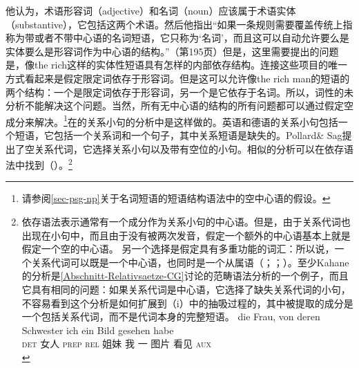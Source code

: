 他认为，术语形容词（adjective）和名词（noun）应该属于术语实体（substantive），它包括这两个术语。然后他指出“如果一条规则需要覆盖传统上指称为带或者不带中心语的名词短语，它只称为‘名词’，而且这可以自动允许要么是实体要么是形容词作为中心语的结构。”（第195页）但是，这里需要提出的问题是，像the rich这样的实体性短语具有怎样的内部依存结构。连接这些项目的唯一方式看起来是假定限定词依存于形容词。但是这可以允许像the rich man的短语的两个结构：一个是限定词依存于形容词，另一个是它依存于名词。所以，词性的未分析不能解决这个问题。当然，所有无中心语的结构的所有问题都可以通过假定空成分来解决。\footnote{请参阅\ref{sec-psg-np}关于名词短语的短语结构语法中的空中心语的假设。}在\hpsgc 的关系小句的分析中是这样做的\citep[\S~5]{ps2}。英语和德语的关系小句包括一个短语，它包括一个关系词和一个句子，其中关系短语是缺失的。Pollard\& Sag提出了空关系代词，它选择关系小句以及带有空位的小句\citep[--217]{ps2}。相似的分析可以在依存语法中找到（\citealp[]{Eroms2000a}）。\footnote{%
依存语法表示通常有一个成分作为关系小句的中心语。但是，由于关系代词也出现在小句中，而且由于没有被两次发音，假定一个额外的中心语基本上就是假定一个空的中心语。
%
另一个选择是假定具有多重功能的词汇：所以说，一个关系代词可以既是一个中心语，也同时是一个从属语（\citealp[\S 246, §8--11]{Tesniere2015a-not-crossreferenced}；\citealp[\page xlvi]{OK2015a}；\citealp[--130]{Kahane2009a}）。至少Kahane的分析是\ref{Abschnitt-Relativsaetze-CG}讨论的范畴语法分析的一个例子，而且它具有相同的问题：如果关系代词是中心语，它选择了缺失关系代词的小句，不容易看到这个分析是如何扩展到（i）中的抽吸过程的，其中被提取的成分是一个包括关系代词，而不是代词本身的完整短语。
\ea
\gll die Frau, von deren Schwester ich ein Bild gesehen habe\\
     \textsc{det} 女人 \textsc{prep} \textsc{rel} 姐妹 我 一 图片 看见 \textsc{aux}\\
\zlast
}

